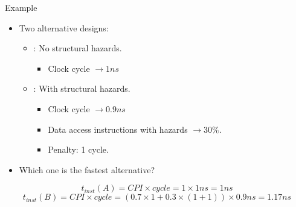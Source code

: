 \begin{frame}[t]{Example}
\begin{itemize}
  \item Two alternative designs:
    \begin{itemize}
      \item {}: No structural hazards.
        \begin{itemize}
          \item Clock cycle $\rightarrow 1 ns$
        \end{itemize}
      \item {}: With structural hazards.
        \begin{itemize}
          \item Clock cycle $\rightarrow 0.9 ns$
          \item Data access instructions with hazards $\rightarrow 30\%$.
          \item Penalty: 1 cycle.
        \end{itemize}
    \end{itemize}
  
  \item Which one is the fastest alternative?
\end{itemize}
\[
t_{inst}(A) =
CPI \times cycle = 1 \times 1 ns = 1 ns
\]
\[
t_{inst}(B) =
CPI \times cycle = (0.7 \times 1 + 0.3 \times (1 + 1)) \times 0.9 ns =
1.17 ns
\]
\end{frame}
